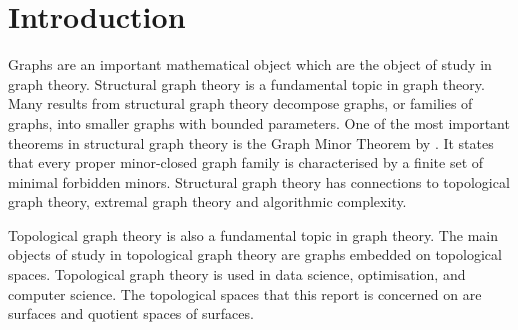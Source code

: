 \chapter{Introduction}\label{sec:introduction}
Graphs are an important mathematical object which are the object of study in graph theory. 
Structural graph theory is a fundamental topic in graph theory. Many results from structural graph theory decompose graphs, or families of graphs, into smaller graphs with bounded parameters. One of the most important theorems in structural graph theory is the Graph Minor Theorem by \textcite{robertsonGraphMinorsXX2004}. It states that every proper minor-closed graph family is characterised by a finite set of minimal forbidden minors. Structural graph theory has connections to topological graph theory, extremal graph theory and algorithmic complexity. 

Topological graph theory is also a fundamental topic in graph theory. The main objects of study in topological graph theory are graphs embedded on topological spaces. Topological graph theory is used in data science, optimisation, and computer science. The topological spaces that this report is concerned on are surfaces and quotient spaces of surfaces. 






%

%

%

